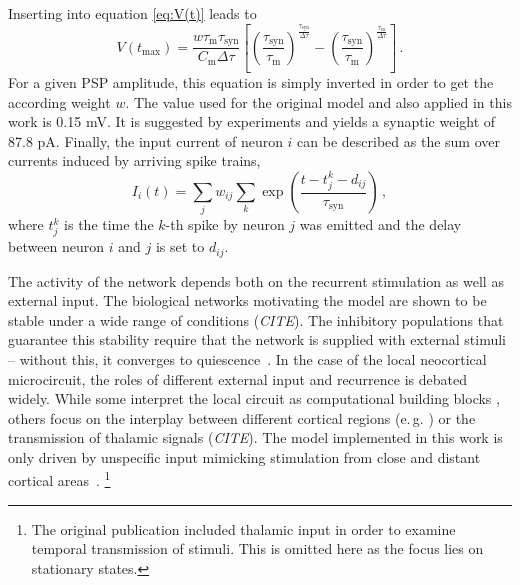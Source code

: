 Inserting into equation \eqref{eq:V(t)} leads to 
\begin{equation}
    V(t_\text{max}) 
        = \frac{w \tau_\text{m} \tau_\text{syn}}{C_\text{m} \Delta\tau}	
            \left[ 
                \left( \frac{\tau_\text{syn}}{\tau_\text{m}} \right)^\frac{\tau_\text{syn}}{\Delta\tau} 
            - \left( \frac{\tau_\text{syn}}{\tau_\text{m}} \right)^\frac{\tau_\text{m}}{\Delta\tau} 
            \right] \,.
    \label{eq:PSP}
\end{equation}
For a given PSP amplitude, this equation is simply inverted in order to get the according 
weight $w$. The value used for the original model and also applied in this work 
is 0.15 mV. It is suggested by experiments and yields 
a synaptic weight of 87.8 pA. 
Finally, the 
input current of neuron $i$ can be described as the sum over currents induced by
arriving spike trains, 
\begin{equation}
    I_i(t) = \sum_j w_{ij} \sum_k \exp\left(\frac{t - t_j^k - d_{ij}}{\tau_\text{syn}}\right) \, ,
    \label{eq:input_current}
\end{equation}
where $t_j^k$ is the time the $k$-th spike by neuron $j$ was emitted and the 
delay between neuron $i$ and $j$ is set to $d_{ij}$. 

The activity of the network depends both on the recurrent stimulation as well as 
external input. The biological networks motivating the model are shown to be 
stable under a wide range of conditions (\emph{CITE}). 
The inhibitory populations that guarantee this stability require that the network 
is supplied with external stimuli -- without this, it converges to quiescence~\cite{brunel2000}.
In the case of the local neocortical microcircuit, the roles of different
external input and recurrence is debated widely. While some interpret the local circuit
as computational building blocks \cite{potjans2014}, others focus on the interplay between 
different cortical regions (e.\,g. ) or the transmission of 
thalamic signals (\emph{CITE}). The model implemented in this work is only driven 
by unspecific input mimicking stimulation from close and distant cortical areas~\cite{potjans2014}.%
\footnote{
The original publication included thalamic input in order to examine temporal transmission 
of stimuli. This is omitted here as the focus lies on stationary states. 
}

